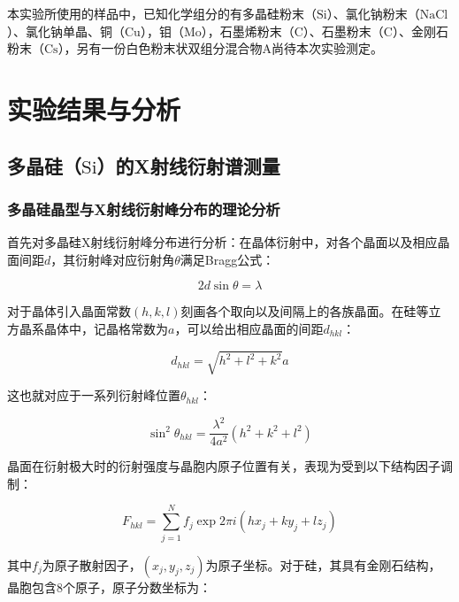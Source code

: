 \documentclass{thuemp}
\begin{document}
本实验所使用的样品中，已知化学组分的有多晶硅粉末（$\text{Si}$）、氯化钠粉末（$\text{NaCl}$）、氯化钠单晶、铜（$\text{Cu}$），钼（$\text{Mo}$），石墨烯粉末（$\text{C}$）、石墨粉末（$\text{C}$）、金刚石粉末（$\text{Cs}$），另有一份白色粉末状双组分混合物A尚待本次实验测定。

\section{实验结果与分析}

\subsection{多晶硅（$\text{Si}$）的X射线衍射谱测量}

\subsubsection{多晶硅晶型与X射线衍射峰分布的理论分析}

首先对多晶硅X射线衍射峰分布进行分析：在晶体衍射中，对各个晶面以及相应晶面间距$d$，其衍射峰对应衍射角$\theta$满足Bragg公式：

\begin{equation}
    2d\sin\theta  = \lambda
    \label{eq:bragg}
\end{equation}

对于晶体引入晶面常数$(h,k,l)$刻画各个取向以及间隔上的各族晶面。在硅等立方晶系晶体中，记晶格常数为$a$，可以给出相应晶面的间距$d_{hkl}$：

\begin{equation}
    d_{hkl} = \sqrt{h^2+l^2+k^2} a
    \label{eq:d_hkl}
\end{equation}

这也就对应于一系列衍射峰位置$\theta_{hkl}$：

\begin{equation}
    \sin^2 \theta_{hkl} = \frac{\lambda^2}{4a^2}(h^2+k^2+l^2)
    \label{eq:theta_hkl}
\end{equation}

晶面在衍射极大时的衍射强度与晶胞内原子位置有关，表现为受到以下结构因子调制：

\begin{equation}
    F_{hkl} = \sum_{j = 1}^{N} f_j \exp{2\pi i (hx_j + ky_j + lz_j)}
    \label{eq:structure_factor}
\end{equation}

其中$f_j$为原子散射因子，$(x_j,y_j,z_j)$为原子坐标。对于硅，其具有金刚石结构，晶胞包含8个原子，原子分数坐标为：
\end{document}
